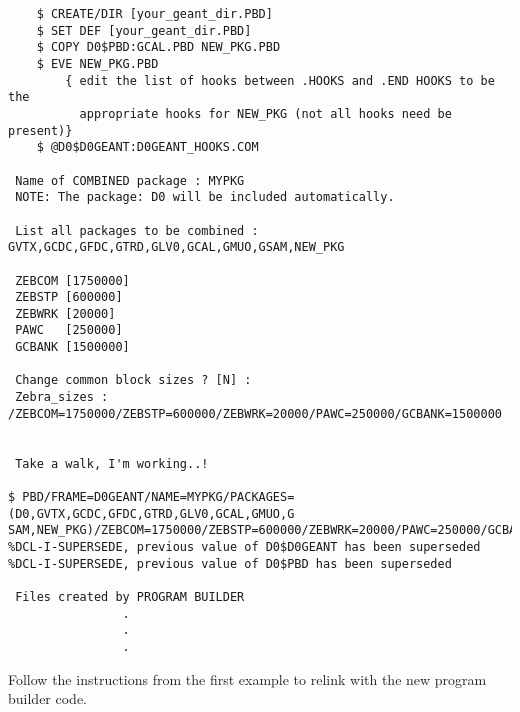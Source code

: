 \begin{verbatim}
    $ CREATE/DIR [your_geant_dir.PBD]
    $ SET DEF [your_geant_dir.PBD]
    $ COPY D0$PBD:GCAL.PBD NEW_PKG.PBD
    $ EVE NEW_PKG.PBD
        { edit the list of hooks between .HOOKS and .END HOOKS to be the
          appropriate hooks for NEW_PKG (not all hooks need be present)}
    $ @D0$D0GEANT:D0GEANT_HOOKS.COM 

 Name of COMBINED package : MYPKG
 NOTE: The package: D0 will be included automatically.

 List all packages to be combined : GVTX,GCDC,GFDC,GTRD,GLV0,GCAL,GMUO,GSAM,NEW_PKG

 ZEBCOM [1750000]
 ZEBSTP [600000]
 ZEBWRK [20000]
 PAWC   [250000]
 GCBANK [1500000]

 Change common block sizes ? [N] :
 Zebra_sizes : /ZEBCOM=1750000/ZEBSTP=600000/ZEBWRK=20000/PAWC=250000/GCBANK=1500000


 Take a walk, I'm working..!

$ PBD/FRAME=D0GEANT/NAME=MYPKG/PACKAGES=(D0,GVTX,GCDC,GFDC,GTRD,GLV0,GCAL,GMUO,G
SAM,NEW_PKG)/ZEBCOM=1750000/ZEBSTP=600000/ZEBWRK=20000/PAWC=250000/GCBANK=1500000
%DCL-I-SUPERSEDE, previous value of D0$D0GEANT has been superseded
%DCL-I-SUPERSEDE, previous value of D0$PBD has been superseded

 Files created by PROGRAM BUILDER
                .
                .
                .
\end{verbatim}

Follow the instructions from the first example to relink with the new program
builder code.


